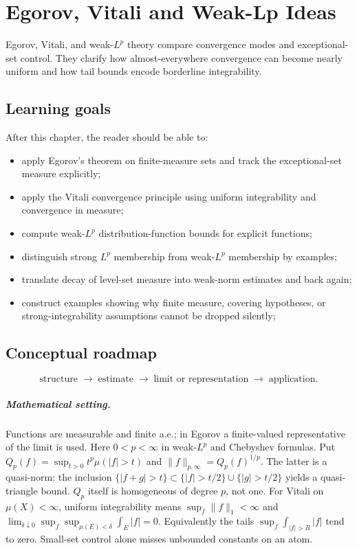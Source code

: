 \chapter{Egorov, Vitali and Weak-Lp Ideas}
\label{ch:iii08}

Egorov, Vitali, and weak-$L^p$ theory compare convergence modes and exceptional-set control. They clarify how almost-everywhere convergence can become nearly uniform and how tail bounds encode borderline integrability.

\section*{Learning goals}
After this chapter, the reader should be able to:
\begin{itemize}
\item apply Egorov's theorem on finite-measure sets and track the exceptional-set measure explicitly;
\item apply the Vitali convergence principle using uniform integrability and convergence in measure;
\item compute weak-\(L^p\) distribution-function bounds for explicit functions;
\item distinguish strong \(L^p\) membership from weak-\(L^p\) membership by examples;
\item translate decay of level-set measure into weak-norm estimates and back again;
\item construct examples showing why finite measure, covering hypotheses, or strong-integrability assumptions cannot be dropped silently;
\end{itemize}
\section*{Conceptual roadmap}
\[
\boxed{\text{structure}\;\longrightarrow\;\text{estimate}\;\longrightarrow\;\text{limit or representation}\;\longrightarrow\;\text{application}.}
\]

\paragraph{Mathematical setting.}
Functions are measurable and finite a.e.; in Egorov a finite-valued representative of the limit is used. Here $0<p<\infty$ in weak-$L^p$ and Chebyshev formulas. Put $Q_p(f)=\sup_{t>0}t^p\mu(|f|>t)$ and $\|f\|_{p,\infty}=Q_p(f)^{1/p}$. The latter is a quasi-norm: the inclusion $\{|f+g|>t\}\subset\{|f|>t/2\}\cup\{|g|>t/2\}$ yields a quasi-triangle bound. $Q_p$ itself is homogeneous of degree $p$, not one. For Vitali on $\mu(X)<\infty$, uniform integrability means $\sup_f\|f\|_1<\infty$ and $\lim_{\delta\downarrow0}\sup_f\sup_{\mu(E)<\delta}\int_E|f|=0$. Equivalently the tails $\sup_f\int_{|f|>R}|f|$ tend to zero. Small-set control alone misses unbounded constants on an atom.

